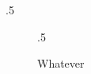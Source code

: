 \documentclass{article}
\begin{document}
\let\tempa\undefined
\begin{subtable}{.5\textwidth}
\caption{Whatever}
\end{subtable}
\ifx\tempa\undefined
  \show\tempa
\else
\fi

\let\tempb\undefined
\begin{figure}
\begin{subtable}{.5\textwidth}
\caption{Whatever}
\end{subtable}
\end{figure}
\ifx\tempb\undefined
  \show\tempa
\else
\fi
\end{document}
